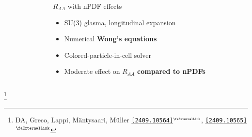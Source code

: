 \documentclass[aspectratio=169,11pt,usenames,dvipsnames]{beamer}
\renewcommand{\thefootnote}{\color{customblue}\faPaperPlaneO}
\newcommand\blfootnote[1]{%
  \begingroup
  \renewcommand\thefootnote{}\footnote{#1}%
  \addtocounter{footnote}{-1}%
  \endgroup
}
\begin{document}
\begin{frame}[t,noframenumbering]
\begin{columns}[onlytextwidth,t]
\begin{figure}
        \end{figure}
        \begin{center}
            {\Large\color{palteal} $R_{AA}$ with nPDF effects \\[10pt]}
            \footnotesize
                \begin{itemize}
                    \item {\color{lightgray}SU(3) glasma, longitudinal expansion}
                    \item {\color{lightgray}Numerical {\bfseries Wong's equations}}
                    \item {\color{lightgray}Colored-particle-in-cell solver}
                    \item {\color{lightgray}Moderate effect on $R_{AA}$ {\bfseries compared to nPDFs}}
                \end{itemize}
        \end{center}
    \end{columns}
    \blfootnote{\scriptsize DA, Greco, Lappi, Mäntysaari, M\"{u}ller \href{https://arxiv.org/abs/2409.10564}{\color{palgold}\texttt{[2409.10564]}$^\text{\tiny\faExternalLink}$}, \href{https://arxiv.org/abs/2409.10565}{\color{palgold}\texttt{[2409.10565]}$^\text{\scalebox{0.9}{\faExternalLink}}$}}
\end{frame}



\end{document}
